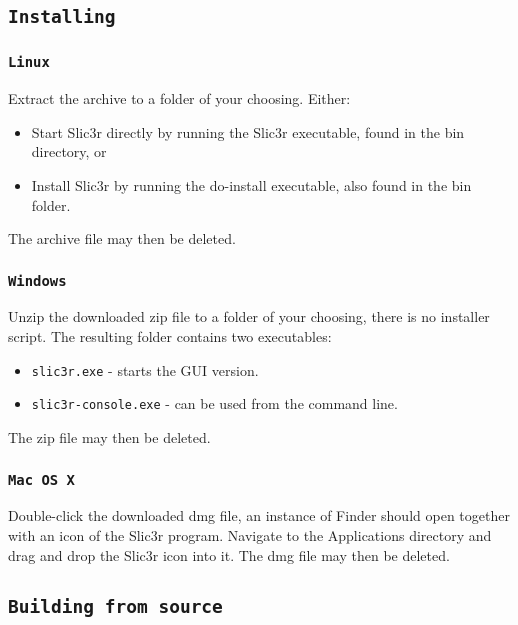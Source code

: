 
\subsection{\texttt{Installing}}

\subsubsection{\texttt{Linux}}

Extract the archive to a folder of your choosing.
Either:
\begin{itemize}
\item Start Slic3r directly by running the Slic3r executable, found in the bin directory, or
\item Install Slic3r by running the do-install executable, also found in the bin folder.
\end{itemize}
The archive file may then be deleted.

\subsubsection{\texttt{Windows}}

Unzip the downloaded zip file to a folder of your choosing, there is no installer script. The resulting folder contains two executables:
\begin{itemize}
\item \texttt{slic3r.exe} - starts the GUI version.
\item \texttt{slic3r-console.exe} - can be used from the command line.
\end{itemize}

The zip file may then be deleted.

\subsubsection{\texttt{Mac OS X}}

Double-click the downloaded dmg file, an instance of Finder should open together with an icon of the Slic3r program.  Navigate to the Applications directory and drag and drop the Slic3r icon into it.
The dmg file may then be deleted.



\subsection{\texttt{Building from source}} %
\label{sec:building_from_source}

